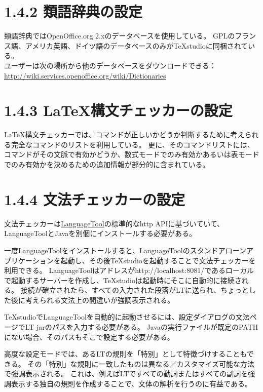 \documentclass[]{book}
\begin{document}
\section{1.4.2 類語辞典の設定}

類語辞典ではOpenOffice.org 2.xのデータベースを使用している。
GPLのフランス語、アメリカ英語、ドイツ語のデータベースのみがTeXstudioに同梱されている。\\
ユーザーは次の場所から他のデータベースをダウンロードできる：
\href{http://wiki.services.openoffice.org/wiki/Dictionaries}{http://wiki.services.openoffice.org/wiki/Dictionaries}\\

\section{1.4.3 LaTeX構文チェッカーの設定}

LaTeX構文チェッカーでは、コマンドが正しいかどうか判断するために考えられる完全なコマンドのリストを利用している。
更に、そのコマンドリストには、コマンドがその文脈で有効かどうか、数式モードでのみ有効かあるいは表モードでのみ有効かを決めるための追加情報が部分的に含まれている。\\

\section{1.4.4 文法チェッカーの設定}

文法チェッカーは\href{http://www.languagetool.org/}{LanguageTool}の標準的なhttp
APIに基づいていて、LanguageToolとJavaを別個にインストールする必要がある。

一度LanguageToolをインストールすると、LanguageToolのスタンドアローンアプリケーションを起動し、その後TeXstudioを起動することで文法チェッカーを利用できる。
LanguageToolはアドレスがhttp://localhost:8081/であるローカルで起動するサーバーを作成し、TeXstudioは起動時にそこに自動的に接続される。
接続が確立されたら、すべての入力された段落がLTに送られ、ちょっとした後に考えられる文法上の間違いが強調表示される。

TeXstudioでLanguageToolを自動的に起動させるには、設定ダイアログの文法ページでLT
jarのパスを入力する必要がある。
Javaの実行ファイルが既定のPATHにない場合、そのパスもそこで設定する必要がある。

高度な設定モードでは、あるLTの規則を「特別」として特徴づけすることもできる。
その「特別」な規則に一致したものは異なる／カスタマイズ可能な方法で強調表示される。
これは、例えばLTですべての動詞またはすべての副詞を強調表示する独自の規則を作成することで、文体の解析を行うのに有益である。
\end{document}
